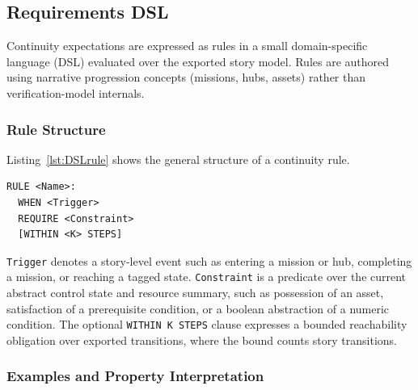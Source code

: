 \documentclass[conference]{IEEEtran}
\begin{document}
\subsection{Requirements DSL}
\label{sec:dsl}

Continuity expectations are expressed as rules in a small
domain-specific language (DSL) evaluated over the exported story model. 
Rules are authored using narrative progression concepts
(missions, hubs, assets) rather than verification-model internals.

\subsubsection{Rule Structure}

Listing~\ref{lst:DSLrule} shows the general structure of a continuity rule.

\begin{lstlisting}[style=UBListingDSL,
                   numbers=none,
                   basicstyle=\ttfamily\scriptsize,
                   caption={General structure of a continuity rule.},
                   label={lst:DSLrule},
                   linewidth=0.98\linewidth]
RULE <Name>:
  WHEN <Trigger>
  REQUIRE <Constraint>
  [WITHIN <K> STEPS]
\end{lstlisting}

\texttt{Trigger} denotes a story-level event such as entering a mission
or hub, completing a mission, or reaching a tagged state.
\texttt{Constraint} is a predicate over the current abstract control
state and resource summary, such as possession of an asset, satisfaction
of a prerequisite condition, or a boolean abstraction of a numeric
condition. The optional \texttt{WITHIN K STEPS} clause expresses a
bounded reachability obligation over exported transitions, where the
bound counts story transitions.

\subsubsection{Examples and Property Interpretation}
\end{document}

